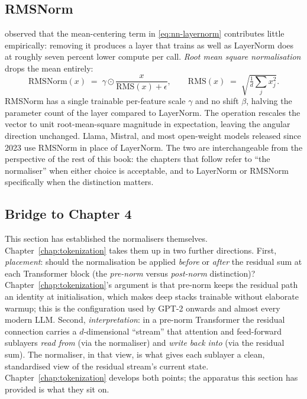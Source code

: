\subsection{RMSNorm}

\citet{zhang2019rmsnorm} observed that the mean-centering term in
\eqref{eq:nn-layernorm} contributes little empirically: removing
it produces a layer that trains as well as LayerNorm does at
roughly seven percent lower compute per call. \emph{Root mean
square normalisation} drops the mean entirely:
\begin{equation}
  \mathrm{RMSNorm}(x) \;=\; \gamma \odot \frac{x}{\mathrm{RMS}(x) + \epsilon},
  \qquad
  \mathrm{RMS}(x) \;=\; \sqrt{\tfrac{1}{d}\sum_j x_j^2}.
  \label{eq:nn-rmsnorm}
\end{equation}
RMSNorm has a single trainable per-feature scale $\gamma$ and no
shift $\beta$, halving the parameter count of the layer compared
to LayerNorm. The operation rescales the vector to unit
root-mean-square magnitude in expectation, leaving the angular
direction unchanged. Llama, Mistral, and most open-weight models
released since 2023 use RMSNorm in place of LayerNorm. The two
are interchangeable from the perspective of the rest of this
book: the chapters that follow refer to ``the normaliser'' when
either choice is acceptable, and to LayerNorm or RMSNorm
specifically when the distinction matters.

\subsection{Bridge to Chapter 4}

This section has established the normalisers themselves.
Chapter~\ref{chap:tokenization} takes them up in two further directions. First,
\emph{placement}: should the normalisation be applied
\emph{before} or \emph{after} the residual sum at each
Transformer block (the \emph{pre-norm} versus \emph{post-norm}
distinction)? Chapter~\ref{chap:tokenization}'s argument is that pre-norm keeps the
residual path an identity at initialisation, which makes deep
stacks trainable without elaborate warmup; this is the
configuration used by GPT-2 onwards and almost every modern
LLM. Second, \emph{interpretation}: in a pre-norm Transformer the
residual connection carries a $d$-dimensional ``stream'' that
attention and feed-forward sublayers \emph{read from} (via the
normaliser) and \emph{write back into} (via the residual sum).
The normaliser, in that view, is what gives each sublayer a
clean, standardised view of the residual stream's current
state. Chapter~\ref{chap:tokenization} develops both points; the apparatus this
section has provided is what they sit on.

